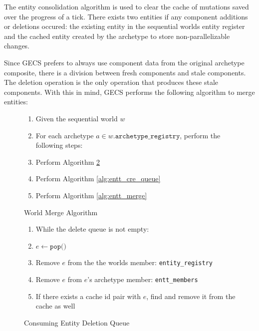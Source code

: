 The entity consolidation algorithm is used to clear the cache of mutations saved over the progress of a tick. There exists two entities if any component additions or deletions occured: the existing entity in the sequential worlds entity register and the cached entity created by the archetype to store non-parallelizable changes. 

Since GECS prefers to always use component data from the original archetype composite, there is a division between fresh components and stale components. The deletion operation is the only operation that produces these stale components. With this in mind, GECS performs the following algorithm to merge entities:

\begin{figure}[H]
    \begin{enumerate}
        \item Given the sequential world $w$
        \item For each archetype $a \in w.\texttt{archetype\_registry}$, perform the following steps:
        \item Perform Algorithm \ref{alg:entt_del_queue}
        \item Perform Algorithm \ref{alg:entt_cre_queue}
        \item Perform Algorithm \ref{alg:entt_merge}
\end{enumerate}
\caption{World Merge Algorithm}
\label{alg:world_merge}
\end{figure}

\begin{figure}[H]
    \begin{enumerate}
        \item While the delete queue is not empty:
        \item $e \leftarrow \texttt{pop()}$
        \item Remove $e$ from the the worlds member: \texttt{entity\_registry} 
        \item Remove $e$ from $e$'s archetype member: \texttt{entt\_members}
        \item If there exists a cache id pair with $e$, find and remove it from the cache as well 
\end{enumerate}
\caption{Consuming Entity Deletion Queue}
\label{alg:entt_del_queue}
\end{figure}

